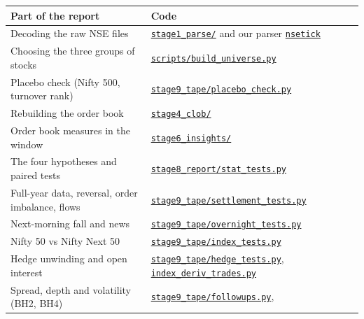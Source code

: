 \documentclass[11pt,a4paper]{article}
\begin{document}
\begin{center}
\footnotesize
\begin{tabularx}{\textwidth}{>{\raggedright\arraybackslash}p{5.2cm}X}
\toprule
Part of the report & Code \\
\midrule
Decoding the raw NSE files & \href{https://github.com/arnav127/nse-fut-analysis/tree/main/stage1_parse}{\texttt{stage1\_parse/}} and our parser
  \href{https://github.com/arnav127/nsetick}{\texttt{nsetick}} \\
Choosing the three groups of stocks & \href{https://github.com/arnav127/nse-fut-analysis/blob/main/scripts/build_universe.py}{\texttt{scripts/build\_universe.py}} \\
Placebo check (Nifty 500, turnover rank) & \href{https://github.com/arnav127/nse-fut-analysis/blob/main/stage9_tape/placebo_check.py}{\texttt{stage9\_tape/placebo\_check.py}} \\
Rebuilding the order book & \href{https://github.com/arnav127/nse-fut-analysis/tree/main/stage4_clob}{\texttt{stage4\_clob/}} \\
Order book measures in the window & \href{https://github.com/arnav127/nse-fut-analysis/tree/main/stage6_insights}{\texttt{stage6\_insights/}} \\
The four hypotheses and paired tests & \href{https://github.com/arnav127/nse-fut-analysis/blob/main/stage8_report/stat_tests.py}{\texttt{stage8\_report/stat\_tests.py}} \\
Full-year data, reversal, order imbalance, flows & \href{https://github.com/arnav127/nse-fut-analysis/blob/main/stage9_tape/settlement_tests.py}{\texttt{stage9\_tape/settlement\_tests.py}} \\
Next-morning fall and news & \href{https://github.com/arnav127/nse-fut-analysis/blob/main/stage9_tape/overnight_tests.py}{\texttt{stage9\_tape/overnight\_tests.py}} \\
Nifty 50 vs Nifty Next 50 & \href{https://github.com/arnav127/nse-fut-analysis/blob/main/stage9_tape/index_tests.py}{\texttt{stage9\_tape/index\_tests.py}} \\
Hedge unwinding and open interest & \href{https://github.com/arnav127/nse-fut-analysis/blob/main/stage9_tape/hedge_tests.py}{\texttt{stage9\_tape/hedge\_tests.py}},
  \href{https://github.com/arnav127/nse-fut-analysis/blob/main/stage9_tape/index_deriv_trades.py}{\texttt{index\_deriv\_trades.py}} \\
Spread, depth and volatility (BH2, BH4) & \href{https://github.com/arnav127/nse-fut-analysis/blob/main/stage9_tape/followups.py}{\texttt{stage9\_tape/followups.py}},

\end{tabularx}
\end{center}
\end{document}
